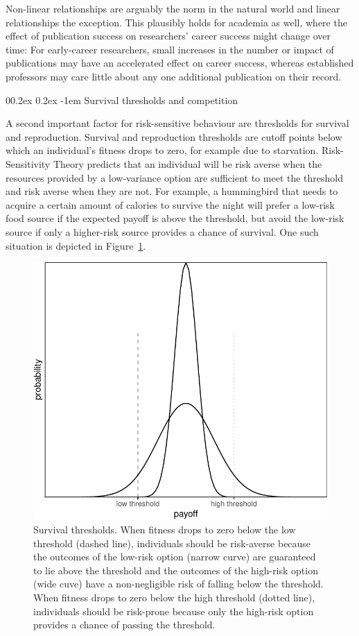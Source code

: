 \documentclass[british,,man,floatsintext]{apa6}
\makeatletter
\renewcommand{\paragraph}{\@startsection{paragraph}{4}{\parindent}%
  {0\baselineskip \@plus 0.2ex \@minus 0.2ex}%
  {-1em}%
  {\normalfont\normalsize\bfseries\itshape\typesectitle}}
\makeatother
\begin{document}
Non-linear relationships are arguably the norm in the natural world and linear relationships the exception.
This plausibly holds for academia as well, where the effect of publication success on researchers' career success might change over time:
For early-career researchers, small increases in the number or impact of publications may have an accelerated effect on career success, whereas established professors may care little about any one additional publication on their record.

\hypertarget{survival-thresholds-and-competition}{%
\paragraph{Survival thresholds and competition}\label{survival-thresholds-and-competition}}

A second important factor for risk-sensitive behaviour are thresholds for survival and reproduction.
Survival and reproduction thresholds are cutoff points below which an individual's fitness drops to zero, for example due to starvation.
Risk-Sensitivity Theory predicts that an individual will be risk averse when the resources provided by a low-variance option are sufficient to meet the threshold and risk averse when they are not.
For example, a hummingbird that needs to acquire a certain amount of calories to survive the night will prefer a low-risk food source if the expected payoff is above the threshold, but avoid the low-risk source if only a higher-risk source provides a chance of survival.
One such situation is depicted in Figure~\ref{fig:varianceplot}.



\begin{figure}

{\centering \includegraphics[width=0.6\linewidth]{rr-risk-sensitivity_files/figure-latex/varianceplot-1} 

}

\caption{Survival thresholds. When fitness drops to zero below the low threshold (dashed line), individuals should be risk-averse because the outcomes of the low-risk option (narrow curve) are guaranteed to lie above the threshold and the outcomes of the high-risk option (wide cuve) have a non-negligible risk of falling below the threshold. When fitness drops to zero below the high threshold (dotted line), individuals should be risk-prone because only the high-risk option provides a chance of passing the threshold.}\label{fig:varianceplot}
\end{figure}
\end{document}

